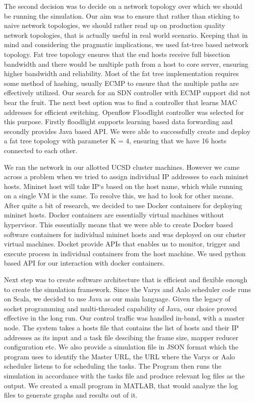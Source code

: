 \documentclass[conference]{IEEEtran}
\begin{document}
The second decision was to decide on a network topology over which we should be running the simulation. Our aim was to ensure that rather than sticking to naive network topologies, we should rather read up on production quality network topologies, that is actually useful in real world scenario. Keeping that in mind and considering the pragmatic implications, we used fat-tree based network topology. Fat tree topology ensures that the end hosts receive full bisection bandwidth and there would be multiple path from a host to core server, ensuring higher bandwidth and reliability. Most of the fat tree implementation requires some method of hashing, usually ECMP to ensure that the multiple paths are effectively utilized. Our search for an SDN controller with ECMP support did not bear the fruit. The next best option was to find a controller that learns MAC addresses for efficient switching. Openflow Floodlight\cite{Floodlight} controller was selected for this purpose. Firstly floodlight supports learning based data forwarding and secondly provides Java based API. We were able to successfully create and deploy a fat tree topology with parameter K = 4, ensuring that we have 16 hosts connected to each other.

We ran the network in our allotted UCSD cluster machines. However we came across a problem when we tried to assign individual IP addresses to each mininet hosts. Mininet host will take IP`s based on the host name, which while running on a single VM is the same. To resolve this, we had to look for other means. After quite a bit of research, we decided to use Docker\cite{Docker} containers for deploying mininet hosts. Docker containers are essentially virtual machines without hypervisor. This essentially means that we were able to create Docker based software containers for individual mininet hosts and was deployed on our cluster virtual machines. Docket provide APIs that enables us to monitor, trigger and execute process in individual containers from the host machine. We used python based API for our interaction with docker containers.

Next step was to create software architecture that is efficient and flexible enough to create the simulation framework. Since the Varys and Aalo scheduler code runs on Scala, we decided to use Java as our main language. Given the legacy of socket programming and multi-threaded capability of Java, our choice proved effective in the long run. Our control traffic was handled in-band, with a master node. The system takes a hosts file that contains the list of hosts and their IP addresses as its input and a task file descibing the frame size, mapper reducer configuration etc. We also provide a simulation file in JSON format which the program uses to identify the Master URL, the URL where the Varys or Aalo scheduler listens to for scheduling the tasks. The Program then runs the simulation in accordance with the tasks file and produce relevant log files as the output. We created a small program in MATLAB, that would analyze the log files to generate graphs and results out of it.
\end{document}
